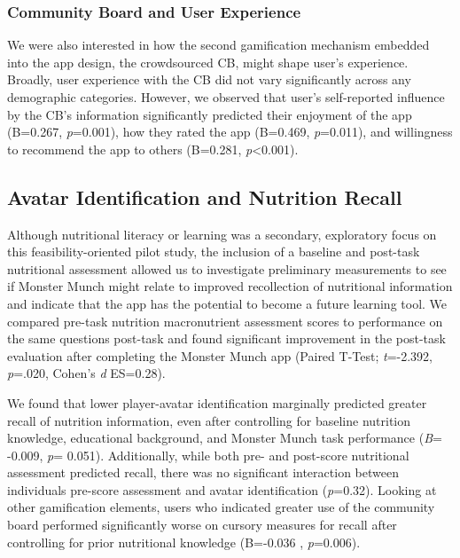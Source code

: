 \vspace{-5pt}
\subsubsection {Community Board and User Experience}
We were also interested in how the second gamification mechanism embedded into the app design, the crowdsourced CB, might shape user's experience.
Broadly, user experience with the CB did not vary significantly across any demographic categories. However, we observed that user's self-reported influence by the CB's information significantly predicted their enjoyment of the app (B=0.267, \textit{p}=0.001), how they rated the app (B=0.469, \textit{p}=0.011), and willingness to recommend the app to others (B=0.281, \textit{p}<0.001).

\vspace{-5pt}
\subsection{Avatar Identification and  Nutrition Recall}

Although nutritional literacy or learning was a secondary, exploratory focus on this feasibility-oriented pilot study, the inclusion of a baseline and post-task nutritional assessment allowed us to investigate preliminary measurements to see if Monster Munch might relate to improved recollection of nutritional information and indicate that the app has the potential to become a future learning tool. We compared pre-task nutrition macronutrient assessment scores to performance on the same questions post-task and found significant improvement in the post-task evaluation after completing the Monster Munch app (Paired T-Test; \textit{t}=-2.392, \textit{p}=.020, Cohen's \textit{d} {ES=0.28}).

We found that lower player-avatar identification marginally predicted greater recall of nutrition information, even after controlling for baseline nutrition knowledge, educational background, and Monster Munch task performance (\textit{B}= -0.009, \textit{p}= 0.051). Additionally, while both pre- and post-score nutritional assessment  predicted recall, there was no significant interaction between individuals pre-score assessment and avatar identification (\textit{p}=0.32). 
Looking at other gamification elements, users who indicated greater use of the community board performed significantly worse on cursory measures for recall after controlling for prior nutritional knowledge (B=-0.036 , \textit{p}=0.006).



